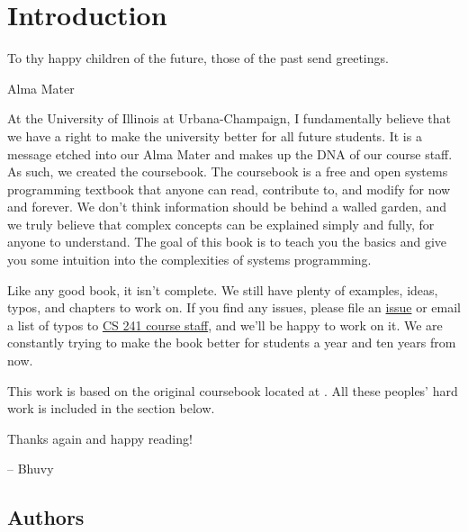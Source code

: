 \chapter{Introduction}

\epigraph{To thy happy children of the future, those of the past send greetings.}{Alma Mater}

At the University of Illinois at Urbana-Champaign, I fundamentally believe that we have a right to make the university better for all future students.
It is a message etched into our Alma Mater and makes up the DNA of our course staff.
As such, we created the coursebook.
The coursebook is a free and open systems programming textbook that anyone can read, contribute to, and modify for now and forever.
We don't think information should be behind a walled garden, and we truly believe that complex concepts can be explained simply and fully, for anyone to understand.
The goal of this book is to teach you the basics and give you some intuition into the complexities of systems programming.

Like any good book, it isn't complete.
We still have plenty of examples, ideas, typos, and chapters to work on.
If you find any issues, please file an \href{https://github.com/illinois-cs241/coursebook/issues}{issue} or email a list of typos to \href{http://cs241.cs.illinois.edu/staff}{CS 241 course staff}, and we'll be happy to work on it.
We are constantly trying to make the book better for students a year and ten years from now.

This work is based on the original coursebook located at .
All these peoples' hard work is included in the section below.

Thanks again and happy reading!

-- Bhuvy

\section{Authors}



